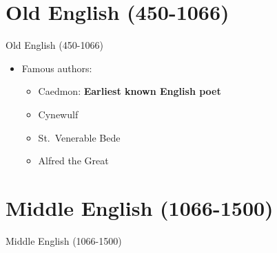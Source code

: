 \documentclass[
  12pt,
    progressbar=frametitle]{beamer}
\providecommand{\tightlist}{%
  \setlength{\itemsep}{0pt}\setlength{\parskip}{0pt}}
\begin{document}
\section{Old English (450-1066)}
\begin{frame}[allowframebreaks]
{Old English (450-1066)}
\begin{itemize}
\tightlist
\item
  Famous authors:

  \begin{itemize}
  \tightlist
  \item
    Caedmon: \textbf{Earliest known English poet}
  \item
    Cynewulf
  \item
    St.~Venerable Bede
  \item
    Alfred the Great
  \end{itemize}
\end{itemize}
\end{frame}

\section{Middle English (1066-1500)}
\begin{frame}[allowframebreaks]
{Middle English (1066-1500)}
\end{frame}
\end{document}

